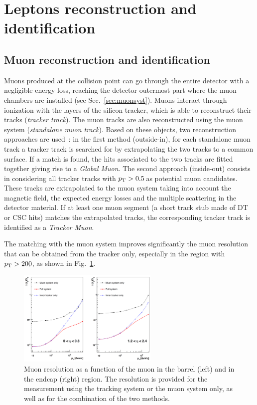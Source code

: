 \section{Leptons reconstruction and identification}\label{sec:leptonID}

\subsection{Muon reconstruction and identification}\label{sec:muID}
Muons produced at the collision point can go through the entire detector with a negligible energy loss, reaching the detector outermost part where the muon chambers are installed (see Sec.~\ref{sec:muonsyst}). Muons interact through ionization with the layers of the silicon tracker, which is able to reconstruct their tracks (\emph{tracker track}). The muon tracks are also reconstructed using the muon system (\emph{standalone muon track}). Based on these objects, two reconstruction approaches are used~\cite{Chatrchyan:2012xi}: in the first method (outside-in), for each standalone muon track a tracker track is searched for by extrapolating the two tracks to a common surface. If a match is found, the hits associated to the two tracks are fitted together giving rise to a \emph{Global Muon}. The second approach (inside-out) consists in considering all tracker tracks with $p_\mathrm{T} > 0.5$\,\GeV as potential muon candidates. These tracks are extrapolated to the muon system taking into account the magnetic field, the expected energy losses and the multiple scattering in the detector material. If at least one muon segment (a short track stub made of DT or CSC hits) matches the extrapolated tracks, the corresponding tracker track is identified as a \emph{Tracker Muon}.

The matching with the muon system improves significantly the muon \pt resolution that can be obtained from the tracker only, especially in the region with $p_\mathrm{T} > 200$\GeV, as shown in Fig.~\ref{fig:muptres}. 
\begin{figure}[htb]
\centering
\includegraphics[width=0.6\textwidth]{images/muptres.png}
\caption{Muon \pt resolution as a function of the muon \pt in the barrel (left) and in the endcap (right) region. The resolution is provided for the measurement using the tracking system or the muon system only, as well as for the combination of the two methods.}\label{fig:muptres}
\end{figure}

